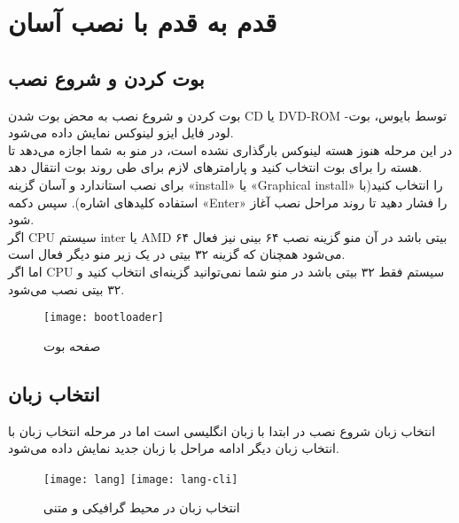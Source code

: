 \section{قدم به قدم با نصب آسان}
\subsection{بوت کردن و شروع نصب}
\begin{frame}{بوت کردن و شروع نصب}
  به محض بوت شدن CD یا DVD-ROM توسط بایوس، بوت-لودر فایل ایزو لینوکس نمایش داده می‌شود.\\
  در این مرحله هنوز هسته لینوکس بارگذاری نشده است، در منو به شما اجازه می‌دهد تا هسته را برای بوت انتخاب کنید و پارامترهای لازم برای طی روند بوت انتقال دهد.\\
  برای نصب استاندارد و آسان گزینه «install» یا «Graphical install» را انتخاب کنید(با استفاده کلید‌های اشاره). سپس دکمه «Enter» را فشار دهید تا روند مراحل نصب آغاز شود.\\
  اگر CPU سیستم inter یا AMD ۶۴ بیتی باشد در آن منو گزینه نصب ۶۴ بینی نیز فعال می‌شود همچنان که گزینه ۳۲ بیتی در یک زیر منو دیگر فعال است.\\
  اما اگر CPU سیستم فقط ۳۲ بیتی باشد در منو شما نمی‌توانید گزینه‌ای انتخاب کنید و ۳۲ بیتی نصب می‌شود.\\
\begin{figure}
    \centering
    \texttt{[image: bootloader]}
    \caption{صفحه بوت~\cite{fig:deb_bootscreen}}
\end{figure}
\end{frame}
\subsection{انتخاب زبان}
\begin{frame}{انتخاب زبان}
  شروع نصب در ابتدا با زبان انگلیسی است اما در مرحله انتخاب زبان با انتخاب زبان دیگر ادامه مراحل با زبان جدید نمایش داده می‌شود.\\
  \begin{figure}
    \texttt{[image: lang]}
    \texttt{[image: lang-cli]}
    \caption{انتخاب زبان در محیط گرافیکی و متنی~\cite{fig:deb_lang_gui}}
  \end{figure}
\end{frame}
